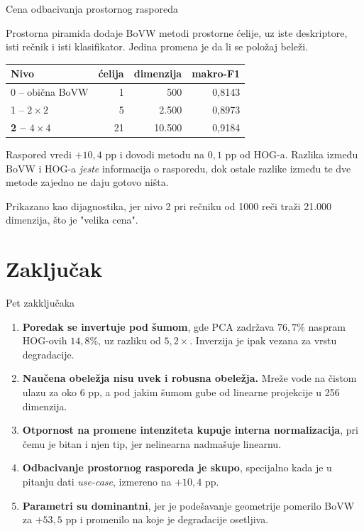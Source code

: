 \documentclass[aspectratio=169, 10pt]{beamer}
\begin{document}
\begin{frame}{Cena odbacivanja prostornog rasporeda}

Prostorna piramida dodaje BoVW metodi prostorne ćelije, uz \alert{iste deskriptore, isti
rečnik i isti klasifikator}. Jedina promena je da li se položaj beleži.

\begin{center}
\begin{tabular}{lrrr}
\toprule
\textbf{Nivo} & \textbf{ćelija} & \textbf{dimenzija} & \textbf{makro-F1} \\
\midrule
0 -- obična BoVW        & 1  & 500    & 0,8143 \\
1 -- $2\times2$         & 5  & 2.500  & 0,8973 \\
\textbf{2 -- $4\times4$} & 21 & 10.500 & \alert{0,9184} \\
\bottomrule
\end{tabular}
\end{center}

\vspace{0.25cm}
Raspored vredi \alert{$+10{,}4$ pp} i dovodi metodu na $0{,}1$ pp od HOG-a. Razlika između
BoVW i HOG-a \emph{jeste} informacija o rasporedu, dok ostale razlike između te dve metode
zajedno ne daju gotovo ništa.

\vspace{0.15cm}
\small
Prikazano kao dijagnostika, jer nivo 2 pri rečniku od 1000 reči traži 21.000 dimenzija, što
je "velika cena".

\end{frame}

\section{Zaključak}

\begin{frame}{Pet zakključaka}

\begin{enumerate}
  \item \textbf{Poredak se invertuje pod šumom}, gde PCA zadržava $76{,}7\%$ naspram
        HOG-ovih $14{,}8\%$, uz razliku od $5{,}2\times$. Inverzija je ipak vezana za vrstu
        degradacije.
  \item \textbf{Naučena obeležja nisu uvek i robusna obeležja.} Mreže vode na čistom
        ulazu za oko $6$ pp, a pod jakim šumom gube od linearne projekcije u 256 dimenzija.
  \item \textbf{Otpornost na promene intenziteta kupuje interna normalizacija}, pri čemu je
        bitan i njen tip, jer nelinearna nadmašuje linearnu.
  \item \textbf{Odbacivanje prostornog rasporeda je skupo}, specijalno kada je u pitanju dati \textit{use-case},
        izmereno na $+10{,}4$ pp.
  \item \textbf{Parametri su dominantni}, jer je podešavanje geometrije pomerilo
        BoVW za $+53{,}5$ pp i promenilo na koje je degradacije osetljiva.
\end{enumerate}

\end{frame}
\end{document}
